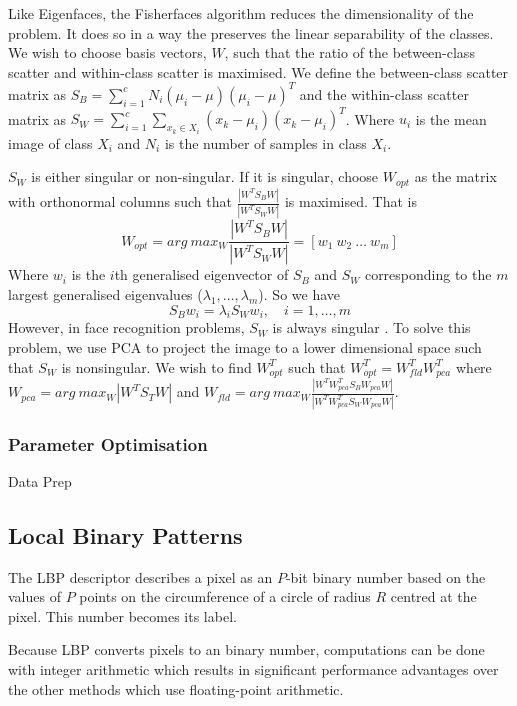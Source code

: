 \documentclass{article}
\begin{document}
Like Eigenfaces, the Fisherfaces algorithm reduces the dimensionality of the problem. It does so in a way the preserves the linear separability of the classes. We wish to choose basis vectors, $W$, such that the ratio of the between-class scatter and within-class scatter is maximised. We define the between-class scatter matrix as $S_B = \sum_{i=1}^{c}N_i(\mu_i - \mu)(\mu_i - \mu)^T$ and the within-class scatter matrix as  $S_W = \sum_{i=1}^{c}\sum_{x_k\in X_i}(x_k - \mu_i)(x_k - \mu_i)^T$. Where $u_i$ is the mean image of class $X_i$ and $N_i$ is the number of samples in class $X_i$.

$S_W$ is either singular or non-singular. If it is singular, choose $W_{opt}$ as the matrix with orthonormal columns such that $\frac{|W^TS_BW|}{|W^TS_WW|}$ is maximised. That is
\begin{equation}
	W_{opt} = arg\ max_W \frac{|W^TS_BW|}{|W^TS_WW|} = [w_1\ w_2\ \ldots\ w_m]
\end{equation}
Where $w_i$ is the $i$th generalised eigenvector of $S_B$ and $S_W$ corresponding to the $m$ largest generalised eigenvalues ($\lambda_1, \ldots, \lambda_m$). So we have
\begin{equation}
	S_Bw_i = \lambda_iS_Ww_i,\quad i=1, \ldots, m
\end{equation}
However, in face recognition problems, $S_W$ is always singular \cite{belhumeur1997eigenfaces}. To solve this problem, we use PCA to project the image to a lower dimensional space such that $S_W$ is nonsingular. We wish to find $W_{opt}^T$ such that $W_{opt}^T = W_{fld}^TW_{pca}^T$ where $W_{pca} = arg\ max_W|W^TS_TW|$ and $W_{fld} = arg\ max_W\frac{|W^TW_{pca}^TS_BW_{pca}W|}{|W^TW_{pca}^TS_WW_{pca}W|}$.

\subsubsection{Parameter Optimisation}
Data Prep

\subsection{Local Binary Patterns}
The LBP descriptor describes a pixel as an $P$-bit binary number based on the values of $P$ points on the circumference of a circle of radius $R$ centred at the pixel. This number becomes its label.

Because LBP converts pixels to an binary number, computations can be done with integer arithmetic which results in significant performance advantages over the other methods which use floating-point arithmetic.
\end{document}
